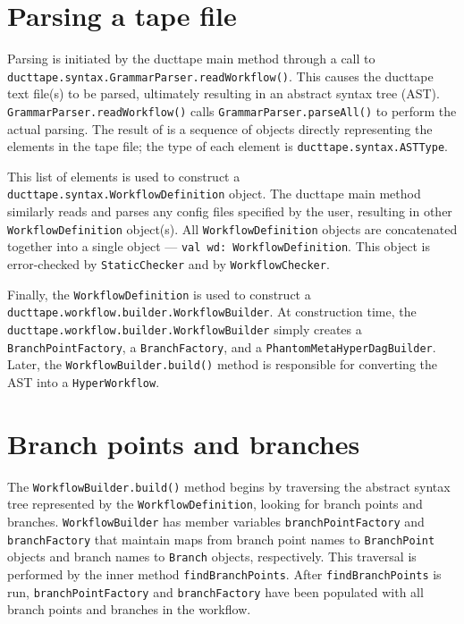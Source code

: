\documentclass{report}
\begin{document}
\section{Parsing a tape file}

Parsing is initiated by the ducttape main method through a call to \texttt{ducttape.syntax.\-GrammarParser.readWorkflow()}.
%
This causes the ducttape text file(s) to be parsed, ultimately resulting in an abstract syntax tree (AST).
%
\texttt{GrammarParser.readWorkflow()} calls \texttt{GrammarParser.parseAll()} to perform the actual parsing.
%
The result of is a sequence of objects directly representing the elements in the tape file;
the type of each element is \texttt{ducttape.syntax.ASTType}.

This list of elements is used to construct a \texttt{ducttape.syntax.WorkflowDefinition} object.
%
The ducttape main method similarly reads and parses any config files specified by the user, resulting in other \texttt{WorkflowDefinition} object(s).
%
All \texttt{WorkflowDefinition} objects are concatenated together into a single object --- \texttt{val wd: WorkflowDefinition}.
%
This object is error-checked by \texttt{StaticChecker} and by \texttt{WorkflowChecker}.

Finally, the \texttt{WorkflowDefinition} is used to construct a \texttt{ducttape.workflow.\-builder.WorkflowBuilder}.
%
At construction time, the \texttt{ducttape.workflow.builder.WorkflowBuilder} simply creates a \texttt{BranchPointFactory}, a \texttt{BranchFactory}, and a \texttt{PhantomMetaHyperDagBuilder}.
%
Later, the \texttt{WorkflowBuilder.build()} method is responsible for converting the AST into a \texttt{HyperWorkflow}.



\section{Branch points and branches}
\label{sec:branchpoints_branches}
The \texttt{WorkflowBuilder.build()} method begins by traversing the abstract syntax tree represented by the \texttt{WorkflowDefinition}, looking for branch points and branches.
%
\texttt{WorkflowBuilder} has member variables \texttt{branchPointFactory} and \texttt{branchFactory} that maintain maps from branch point names to \texttt{BranchPoint} objects and branch names to \texttt{Branch} objects, respectively.
%
This traversal is performed by the inner method \texttt{findBranchPoints}.
%
After \texttt{findBranchPoints} is run, \texttt{branchPointFactory} and \texttt{branchFactory} have been populated with all branch points and branches in the workflow.
\end{document}
